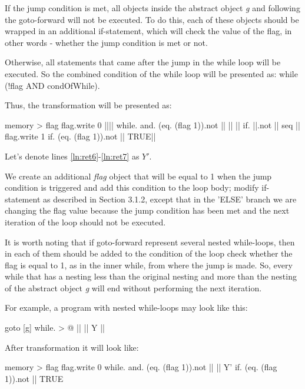 \documentclass[sigplan,review,11pt,nonacm,natbib=false]{acmart}
\begin{document}
If the jump condition is met, all objects inside the abstract object \emph{g} and following the goto-forward will not be executed. To do this, each of these objects should be wrapped in an additional if-statement, which will check the value of the flag, in other words - whether the jump condition is met or not.

Otherwise, all statements that came after the jump in the while loop will be executed.
So the combined condition of the while loop will be presented as: while (!flag AND condOfWhile).

Thus, the transformation will be presented as:

\begin{ffcode}
memory > flag
flag.write 0
|||$\label{ln:ret6}$|
  while.
    and.
      (eq. (flag 1)).not
      ||
    ||
      ||
      if.
        ||.not
        ||
        seq
          ||
          flag.write 1
      if.
        (eq. (flag 1)).not
        ||
        TRUE|$\label{ln:ret7}$|
\end{ffcode}

Let's denote lines \ref{ln:ret6}-\ref{ln:ret7} as $Y'$.

We create an additional \emph{flag} object that will be equal to 1 when the jump condition is triggered and add this condition to the loop body; modify if-statement as described in Section 3.1.2, except that in the 'ELSE' branch we are changing the flag value because the jump condition has been met and the next iteration of the loop should not be executed.

It is worth noting that if goto-forward represent several nested while-loops, then in each of them should be added to the condition of the loop check whether the flag is equal to 1, as in the inner while, from where the jump is made. So, every while that has a nesting less than the original nesting and more than the nesting of the abstract object \emph{g} will end without performing the next iteration.

For example, a program with nested while-loops may look like this:
\begin{ffcode}
goto
  [g]
    while. > @
      ||
      ||
        Y
        ||
\end{ffcode}

After transformation it will look like:
\begin{ffcode}
memory > flag
flag.write 0
while.
  and.
    (eq. (flag 1)).not
    ||
  ||
    Y'
    if.
      (eq. (flag 1)).not
      ||
      TRUE
\end{ffcode}
\end{document}
